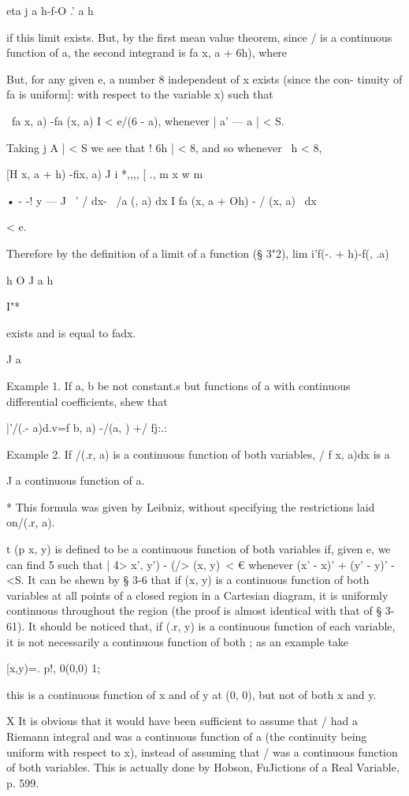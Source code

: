 eta j a h-f-O .' a h

if this limit exists. But, by the first mean value theorem, since / is
a continuous function of a, the second integrand is fa x, a + 6h),
where

But, for any given e, a number 8 independent of x exists (since the
con- tinuity of fa is uniform]: with respect to the variable x) such
that

\ fa x, a) -fa (x, a) I < e/(6 - a), whenever | a' — a | < S.

Taking j A | < S we see that ! 6h | < 8, and so whenever \ h < 8,

[H x, a + h) -fix, a) J i *,,,, [ ., m x w m

• - -! y — J \ ' / dx- \ /a (, a) dx I fa (x, a + Oh) - / (x, a) \ dx

< e.

Therefore by the definition of a limit of a function (§ 3"2), lim
i'f(-. + h)-f(, .a)

h O J a h

I"*

exists and is equal to fadx.

J a

Example 1. If a, b be not constant.s but functions of a with
continuous differential coefficients, shew that

 |'/(.- a)d.v=f b, a) -/(a, ) +/ fj:.:

Example 2. If /(.r, a) is a continuous function of both variables, / f
x, a)dx is a

J a continuous function of a.

* This formula was given by Leibniz, without specifying the
restrictions laid on/(.r, a).

t (p x, y) is defined to be a continuous function of both variables
if, given e, we can find 5 such that | 4> x', y') - (/> (x, y)\ < €
whenever (x' - x)' + (y' - y)' -<S. It can be shewn by § 3-6 that if
(x, y) is a continuous function of both variables at all points of a
closed region in a Cartesian diagram, it is uniformly continuous
throughout the region (the proof is almost identical with that of §
3-61). It should be noticed that, if (.r, y) is a continuous function
of each variable, it is not necessarily a continuous function of both
; as an example take

 [x,y)=. p!, 0(0,0) 1;

this is a continuous function of x and of y at (0, 0), but not of both
x and y.

X It is obvious that it would have been sufficient to assume that /
had a Riemann integral and was a continuous function of a (the
continuity being uniform with respect to x), instead of assuming that
/ was a continuous function of both variables. This is actually done
by Hobson, FuJictions of a Real Variable, p. 599.


